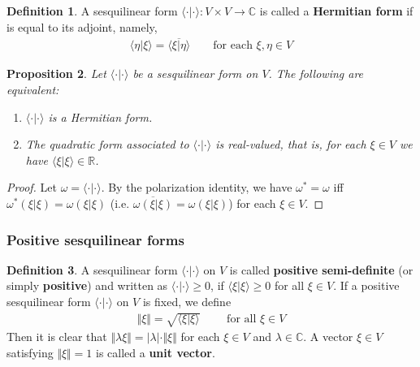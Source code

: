 \documentclass[12pt,b5paper,notitlepage]{article}
\theoremstyle{definition}
\newtheorem{df}{Definition}[subsection]
\theoremstyle{plain}
\newtheorem{pp}[df]{Proposition}
\newcommand{\ovl}{\overline}
\newcommand{\bk}[1]{\langle {#1}\rangle}
\newcommand{\Cbb}{\mathbb C}
\newcommand{\Rbb}{\mathbb R}
\numberwithin{equation}{section}
\begin{document}
\begin{df}
A sesquilinear form $\bk{\cdot|\cdot}:V\times V\rightarrow\Cbb$ is called a \textbf{Hermitian form}  if is equal to its adjoint, namely, 
\begin{align*}
\bk{\eta|\xi}=\ovl{\bk{\xi|\eta}}\qquad\text{for each }\xi,\eta\in V
\end{align*}
\end{df}



\begin{pp}\label{lb113}
Let $\bk{\cdot|\cdot}$ be a sesquilinear form on $V$. The following are equivalent:
\begin{enumerate}[label=(\arabic*)]
\item $\bk{\cdot|\cdot}$ is a Hermitian form.
\item The quadratic form associated to $\bk{\cdot|\cdot}$ is real-valued, that is, for each $\xi\in V$ we have $\bk{\xi|\xi}\in\Rbb$.
\end{enumerate}
\end{pp}


\begin{proof}
Let $\omega=\bk{\cdot|\cdot}$. By the polarization identity, we have $\omega^*=\omega$ iff $\omega^*(\xi|\xi)=\omega(\xi|\xi)$ (i.e. $\ovl{\omega(\xi|\xi)}=\omega(\xi|\xi)$) for each $\xi\in V$. 
\end{proof}



\subsubsection{Positive sesquilinear forms}


\begin{df}\label{lb139}
A sesquilinear form $\bk{\cdot|\cdot}$ on $V$ is called \textbf{positive semi-definite} (or simply \textbf{positive}) and written as $\bk{\cdot|\cdot}\geq0$,  if $\bk{\xi|\xi}\geq0$ for all $\xi\in V$. If a positive sesquilinear form $\bk{\cdot|\cdot}$ on $V$ is fixed, we define
\begin{align}
\Vert \xi\Vert=\sqrt{\bk{\xi|\xi}}\qquad\text{ for all }\xi\in V
\end{align} 
Then it is clear that $\Vert\lambda \xi\Vert=|\lambda|\cdot\Vert \xi\Vert$ for each $\xi\in V$ and $\lambda\in\Cbb$. A vector $\xi\in V$ satisfying $\Vert \xi\Vert=1$ is called a \textbf{unit vector}.  
\end{df}
\end{document}
